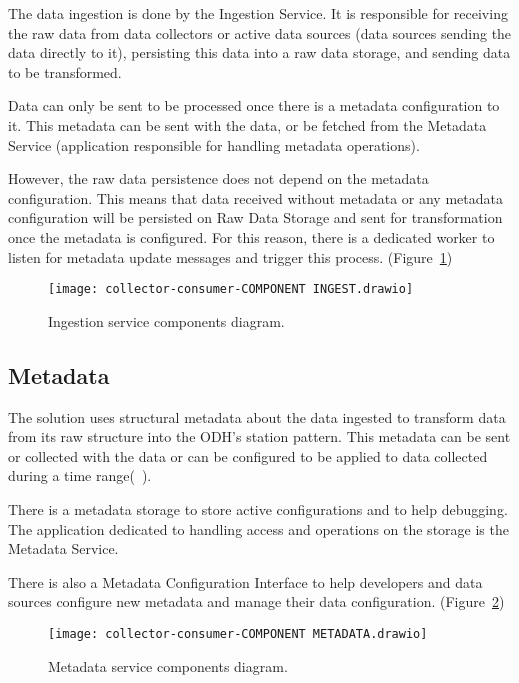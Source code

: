 The data ingestion is done by the Ingestion Service. It is responsible for receiving the raw data from data collectors or active data sources (data sources sending the data directly to it), persisting this data into a raw data storage, and sending data to be transformed.

Data can only be sent to be processed once there is a metadata configuration to it. This metadata can be sent with the data, or be fetched from the Metadata Service (application responsible for handling metadata operations).

However, the raw data persistence does not depend on the metadata configuration. This means that data received without metadata or any metadata configuration will be persisted on Raw Data Storage and sent for transformation once the metadata is configured. For this reason, there is a dedicated worker to listen for metadata update messages and trigger this process. (Figure~\ref{fig:ingest})

\begin{figure}
    \centering
    \texttt{[image: collector-consumer-COMPONENT INGEST.drawio]}
    \caption{Ingestion service components diagram.\label{fig:ingest}}
\end{figure}

\subsection{Metadata}
\label{sec:metadata}

The solution uses structural metadata about the data ingested to transform data from its raw structure into the ODH's station pattern. This metadata can be sent or collected with the data or can be configured to be applied to data collected during a time range(~\cite{Metadata}).

There is a metadata storage to store active configurations and to help debugging. The application dedicated to handling access and operations on the storage is the Metadata Service.

There is also a Metadata Configuration Interface to help developers and data sources configure new metadata and manage their data configuration. (Figure~\ref{fig:metadata})

\begin{figure}
    \centering
    \texttt{[image: collector-consumer-COMPONENT METADATA.drawio]}
    \caption{Metadata service components diagram.\label{fig:metadata}}
\end{figure}

